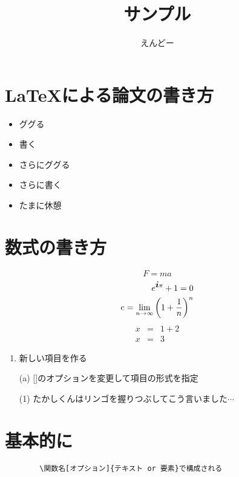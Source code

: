 \documentclass[dvipdfmx,uplatex]{jsarticle}%
\newcommand{\bvec}[1]{\mbox{\boldmath $#1$}}%
\begin{document}
\title{サンプル}
\author{えんどー}  
\maketitle
\section{\LaTeX による論文の書き方}
\begin{itemize}
    \item ググる
    \large %
    \item 書く
    \Large %
    \item さらにググる
    \LARGE %
    \item さらに書く
    \small
    \item たまに休憩
\end{itemize}
\section{数式の書き方}
\large
    \begin{equation}
        F = ma
    \end{equation}
    \begin{eqnarray}
        e^{\bvec{i}\pi} + 1 = 0 \label{2} \\%
        e = \lim_{n \to \infty} \left( 1 + \frac{1}{n} \right) ^n \label{3} \\ %
    \end{eqnarray}
    \begin{eqnarray*} %
        x &=& 1 + 2 \\ %
        x &=& 3 
    \end{eqnarray*}
\begin{enumerate}
    \item 新しい項目を作る
    \item[(a)] []のオプションを変更して項目の形式を指定
    \item[(1)] たかしくんはリンゴを握りつぶしてこう言いました$\cdots$  %
\end{enumerate}

\newpage  %

\section{基本的に}
    \begin{verbatim} 
        \関数名[オプション]{テキスト or 要素}で構成される
    \end{verbatim}
\end{document}
